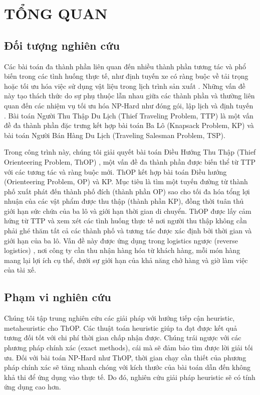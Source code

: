 \chapter{TỔNG QUAN} \label{chapter:Introduction}

\section{Đối tượng nghiên cứu}

Các bài toán đa thành phần liên quan đến nhiều thành phần tương tác và phổ biến trong các tình huống thực tế, như định tuyến xe có ràng buộc về tải trọng \cite{doi:10.1287/trsc.1060.0165} hoặc tối ưu hóa việc sử dụng vật liệu trong lịch trình sản xuất \cite{10.1007/978-3-642-21827-9_23}. Những vấn đề này tạo thách thức do sự phụ thuộc lẫn nhau giữa các thành phần và thường liên quan đến các nhiệm vụ tối ưu hóa NP-Hard như đóng gói, lập lịch và định tuyến \cite{Bonyadi2019}. Bài toán Người Thu Thập Du Lịch (Thief Traveling Problem, TTP) \cite{6557681} là một vấn đề đa thành phần đặc trưng kết hợp bài toán Ba Lô (Knapsack Problem, KP) và bài toán Người Bán Hàng Du Lịch (Traveling Salesman Problem, TSP).

Trong công trình này, chúng tôi giải quyết bài toán Điều Hướng Thu Thập (Thief Orienteering Problem, ThOP) \cite{8477853}, một vấn đề đa thành phần được biến thể từ TTP với các tương tác và ràng buộc mới. ThOP kết hợp bài toán Điều hướng (Orienteering Problem, OP) \cite{OP} và KP. Mục tiêu là tìm một tuyến đường từ thành phố xuất phát đến thành phố đích (thành phần OP) sao cho tối đa hóa tổng lợi nhuận của các vật phẩm được thu thập (thành phần KP), đồng thời tuân thủ giới hạn sức chứa của ba lô và giới hạn thời gian di chuyển. ThOP được lấy cảm hứng từ TTP và xem xét các tình huống thực tế nơi người thu thập không cần phải ghé thăm tất cả các thành phố và tương tác được xác định bởi thời gian và giới hạn của ba lô. Vấn đề này được ứng dụng trong logistics ngược (reverse logistics) \cite{8477853}, nơi công ty cần thu nhận hàng hóa từ khách hàng, mỗi món hàng mang lại lợi ích cụ thể, dưới sự giới hạn của khả năng chở hàng và giờ làm việc của tài xế.

\section{Phạm vi nghiên cứu}

Chúng tôi tập trung nghiên cứu các giải pháp với hướng tiếp cận heuristic, metaheuristic cho ThOP. Các thuật toán heuristic giúp ta đạt được kết quả tương đối tốt với chi phí thời gian chấp nhận được. Chúng trái ngược với các phương pháp chính xác (exact methods), cái mà sẽ đảm bảo tìm được lời giải tối ưu. Đối với bài toán NP-Hard như ThOP, thời gian chạy cần thiết của phương pháp chính xác sẽ tăng nhanh chóng với kích thước của bài toán dẫn đến không khả thi để ứng dụng vào thực tế. Do đó, nghiên cứu giải pháp heuristic sẽ có tính ứng dụng cao hơn.

